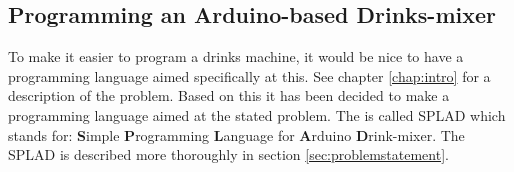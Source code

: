 \subsection{Programming an Arduino-based Drinks-mixer}
To make it easier to program a drinks machine, it would be nice to have a programming language aimed specifically at this. See chapter \ref{chap:intro} for a description of the problem. Based on this it has been decided to make a programming language aimed at the stated problem. The is called SPLAD which stands for: \textbf{S}imple \textbf{P}rogramming \textbf{L}anguage for \textbf{A}rduino \textbf{D}rink-mixer. The SPLAD is described more thoroughly in section \ref{sec:problemstatement}.